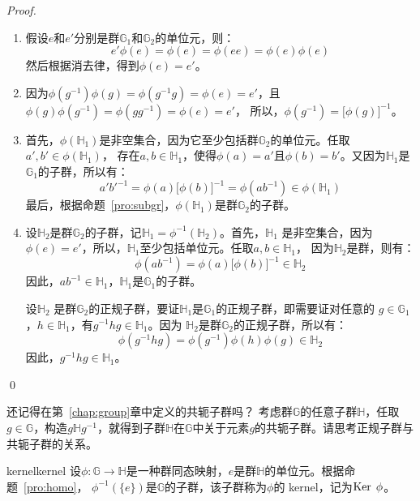 	\begin{proof}
		\begin{enumerate}
		\item 假设$e$和$e'$分别是群$\mathbb{G}_1$和$\mathbb{G}_2$的单位元，则：
		\[ e'\phi(e) = \phi(e) = \phi(ee) = \phi(e)\phi(e)\]
		然后根据消去律，得到$\phi(e) = e'$。
		
		\item 因为$\phi(g^{-1} )\phi(g)=\phi(g^{-1} g)=\phi(e)=e'$，且$\phi(g) \phi(g^{-1} ) = \phi(g g^{-1}) = \phi(e) = e'$，
		所以，$\phi(g^{-1} ) = \lbrack\phi(g)\rbrack^{-1}$。
		
		\item 首先，$\phi(\mathbb{H}_1)$是非空集合，因为它至少包括群$\mathbb{G}_2$的单位元。任取$a', b' \in \phi(\mathbb{H}_1)$，
		存在$a, b\in \mathbb{H}_1$，使得$\phi(a) = a'$且$\phi(b)=b'$。又因为$\mathbb{H}_1$是$\mathbb{G}_1$的子群，所以有：
		\[ a' b'^{-1} = \phi(a) \lbrack\phi(b)\rbrack^{-1} = \phi(a b^{-1})  \in \phi(\mathbb{H}_1)\]
		最后，根据命题~\ref{pro:subgr}，$\phi(\mathbb{H}_1)$是群$\mathbb{G}_2$的子群。
		
		\item 设$\mathbb{H}_2$是群$\mathbb{G}_2$的子群，记$\mathbb{H}_1 = \phi^{-1}(\mathbb{H}_2)$。首先，$\mathbb{H}_1$
		是非空集合，因为$\phi(e) = e'$，所以，$\mathbb{H}_1$至少包括单位元。任取$a, b \in \mathbb{H}_1$，
		因为$\mathbb{H}_2$是群，则有：
		\[\phi(ab^{-1} )= \phi(a)\lbrack\phi(b)\rbrack^{-1} \in \mathbb{H}_2\]
		因此，$ab^{-1} \in \mathbb{H}_1$，$\mathbb{H}_1$是$\mathbb{G}_1$的子群。
		
		设$\mathbb{H}_2$ 是群$\mathbb{G}_2$的正规子群，要证$\mathbb{H}_1$是$\mathbb{G}_1$的正规子群，即需要证对任意的
		$g\in \mathbb{G}_1$，$h \in \mathbb{H}_1$，有$g^{-1} h g \in \mathbb{H}_1$。因为
		$\mathbb{H}_2$是群$\mathbb{G}_2$的正规子群，所以有：
		\[\phi(g^{-1} h g ) = \phi(g^{-1}) \phi(h) \phi(g) \in \mathbb{H}_2\]
		因此，$g^{-1} h g \in \mathbb{H}_1$。
		\end{enumerate}
		\qed
	\end{proof}

\begin{thinking}
	还记得在第~\ref{chap:group}章中定义的共轭子群吗？
	考虑群$\mathbb{G}$的任意子群$\mathbb{H}$，任取$g \in \mathbb{G}$，构造$g \mathbb{H} g^{-1}$，就得到子群$\mathbb{H}$在$\mathbb{G}$中关于元素$g$的共轭子群。请思考正规子群与共轭子群的关系。
\end{thinking}

		\begin{definition}{kernel}{kernel}
		   	设$\phi\colon \mathbb{G} \to \mathbb{H}$是一种群同态映射，$e$是群$\mathbb{H}$的单位元。根据命题~\ref{pro:homo}，
		   	$\phi^{-1}(\{ e \})$是$\mathbb{G}$的子群，该子群称为$\phi$的 kernel，记为$\operatorname{Ker}\; \phi$。
	\end{definition}
	
